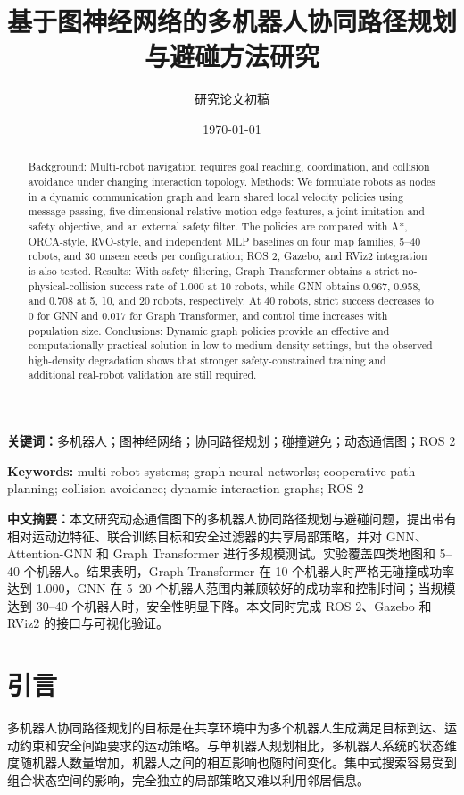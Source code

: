 \documentclass[UTF8,a4paper,11pt]{ctexart}
\title{基于图神经网络的多机器人协同路径规划与避碰方法研究}
\author{研究论文初稿}
\date{\today}
\newcommand{\keywords}[1]{\par\noindent\textbf{Keywords: }#1}
\begin{document}
\maketitle

\begin{abstract}
Background: Multi-robot navigation requires goal reaching, coordination, and collision avoidance under changing interaction topology. Methods: We formulate robots as nodes in a dynamic communication graph and learn shared local velocity policies using message passing, five-dimensional relative-motion edge features, a joint imitation-and-safety objective, and an external safety filter. The policies are compared with A*, ORCA-style, RVO-style, and independent MLP baselines on four map families, 5--40 robots, and 30 unseen seeds per configuration; ROS 2, Gazebo, and RViz2 integration is also tested. Results: With safety filtering, Graph Transformer obtains a strict no-physical-collision success rate of 1.000 at 10 robots, while GNN obtains 0.967, 0.958, and 0.708 at 5, 10, and 20 robots, respectively. At 40 robots, strict success decreases to 0 for GNN and 0.017 for Graph Transformer, and control time increases with population size. Conclusions: Dynamic graph policies provide an effective and computationally practical solution in low-to-medium density settings, but the observed high-density degradation shows that stronger safety-constrained training and additional real-robot validation are still required.
\end{abstract}

\noindent\textbf{关键词：}多机器人；图神经网络；协同路径规划；碰撞避免；动态通信图；ROS 2
\keywords{multi-robot systems; graph neural networks; cooperative path planning; collision avoidance; dynamic interaction graphs; ROS 2}

\noindent\textbf{中文摘要：}本文研究动态通信图下的多机器人协同路径规划与避碰问题，提出带有相对运动边特征、联合训练目标和安全过滤器的共享局部策略，并对 GNN、Attention-GNN 和 Graph Transformer 进行多规模测试。实验覆盖四类地图和 5--40 个机器人。结果表明，Graph Transformer 在 10 个机器人时严格无碰撞成功率达到 1.000，GNN 在 5--20 个机器人范围内兼顾较好的成功率和控制时间；当规模达到 30--40 个机器人时，安全性明显下降。本文同时完成 ROS 2、Gazebo 和 RViz2 的接口与可视化验证。

\section{引言}
多机器人协同路径规划的目标是在共享环境中为多个机器人生成满足目标到达、运动约束和安全间距要求的运动策略。与单机器人规划相比，多机器人系统的状态维度随机器人数量增加，机器人之间的相互影响也随时间变化。集中式搜索容易受到组合状态空间的影响，完全独立的局部策略又难以利用邻居信息。
\end{document}
